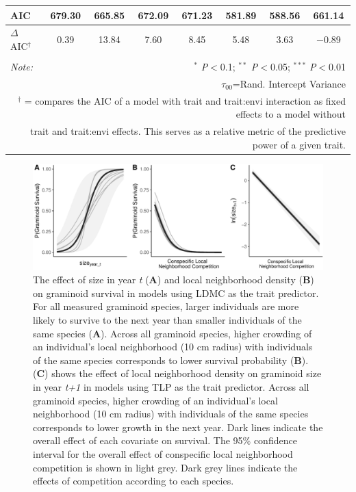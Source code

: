 \documentclass[12pt, letterpaper]{article}
\begin{document}
\begin{table}[h]
{\begin{tabular}{lccccccc}
AIC & 679.30 & 665.85 & 672.09 & 671.23 & 581.89 & 588.56 & 661.14 \\ 
\hline 
\rowcolor[gray]{.95}$\Delta$ AIC$^\dagger$  & 0.39 & 13.84 & 7.60 & 8.45 & 5.48 & 3.63 & $-$0.89 \\
\hline 
\hline \\[-1.8ex] 
\textit{Note:}  & \multicolumn{7}{r}{$^{*}$ \textit{P}$<$0.1; $^{**}$ \textit{P}$<$0.05; $^{***}$ \textit{P}$<$0.01} \\ 
\multicolumn{8}{r}{$\tau_{00}$=Rand. Intercept Variance}\\ 
\multicolumn{8}{r}{$^\dagger$ = compares the AIC of a model with trait and trait:envi interaction as fixed effects to a model without}\\
\multicolumn{8}{r}{trait and trait:envi effects. This serves as a relative metric of the predictive power of a given trait.}
\end{tabular} }
\end{table} 

\begin{figure}
    \centering
    \includegraphics[width=.8\textwidth]{survEffectPlots-1.pdf}
    \caption{The effect of size in year \textit{t} (\textbf{A}) and local neighborhood density (\textbf{B}) on graminoid survival in models using LDMC as the trait predictor. For all measured graminoid species, larger individuals are more likely to survive to the next year than smaller individuals of the same species (\textbf{A}). Across all graminoid species, higher crowding of an individual's local neighborhood (10 cm radius) with individuals of the same species corresponds to lower survival probability (\textbf{B}). (\textbf{C}) shows the effect of local neighborhood density on graminoid size in year \textit{t+1} in models using TLP as the trait predictor. Across all graminoid species, higher crowding of an individual's local neighborhood (10 cm radius) with individuals of the same species corresponds to lower growth in the next year. Dark lines indicate the overall effect of each covariate on survival. The 95\% confidence interval for the overall effect of conspecific local neighborhood competition is shown in light grey. Dark grey lines indicate the effects of competition according to each species.}
    \label{fig:Effects_Survival}
\end{figure}
\end{document}
